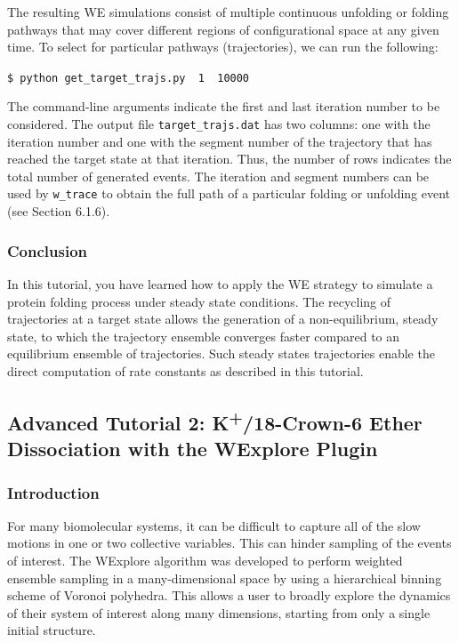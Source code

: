 \documentclass[9pt,tutorial]{livecoms}
\begin{document}
The resulting WE simulations consist of multiple continuous unfolding or folding pathways that may cover different regions of configurational space at any given time. 
To select for particular pathways (trajectories), we can run the following: 
 
\verb|$ python get_target_trajs.py  1  10000|

The command-line arguments indicate the first and last iteration number to be considered. 
The output file \verb|target_trajs.dat| has two columns: one with the iteration number and one with the segment number of the trajectory that has reached the target state at that iteration. 
Thus, the number of rows indicates the total number of generated events. 
The iteration and segment numbers can be used by \verb|w_trace| to obtain the full path of a particular folding or unfolding event (see Section 6.1.6).

\subsubsection{Conclusion}

In this tutorial, you have learned how to apply the WE strategy to simulate a protein folding process under steady state conditions. 
The recycling of trajectories at a target state allows the generation of a non-equilibrium, steady state, to which the trajectory ensemble converges faster compared to an equilibrium ensemble of trajectories. 
Such steady states trajectories enable  the direct computation of rate constants as described in this tutorial.   

\subsection{Advanced Tutorial 2: K\textsuperscript{+}/18-Crown-6 Ether Dissociation with the WExplore Plugin}

\subsubsection{Introduction}

For many biomolecular systems, it can be difficult to capture all of the slow motions in one or two collective variables. 
This can hinder sampling of the events of interest. 
The WExplore algorithm was developed to perform weighted ensemble sampling in a many-dimensional space by using a hierarchical binning scheme of Voronoi polyhedra. 
This allows a user to broadly explore the dynamics of their system of interest along many dimensions, starting from only a single initial structure.
\end{document}
